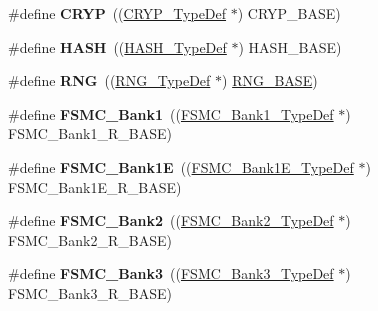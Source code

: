 \begin{DoxyCompactItemize}
\item 
\mbox{\label{group___peripheral__declaration_gaf8c417168aefe66429b5f1b6adc9effa}} 
\#define {\bfseries C\+R\+YP}~((\hyperlink{struct_c_r_y_p___type_def}{C\+R\+Y\+P\+\_\+\+Type\+Def} $\ast$) C\+R\+Y\+P\+\_\+\+B\+A\+SE)
\item 
\mbox{\label{group___peripheral__declaration_ga7172fe24d1ffc31d15b20a77ea9f34dd}} 
\#define {\bfseries H\+A\+SH}~((\hyperlink{struct_h_a_s_h___type_def}{H\+A\+S\+H\+\_\+\+Type\+Def} $\ast$) H\+A\+S\+H\+\_\+\+B\+A\+SE)
\item 
\mbox{\label{group___peripheral__declaration_ga5b0885b8b55bbc13691092b704d9309f}} 
\#define {\bfseries R\+NG}~((\hyperlink{struct_r_n_g___type_def}{R\+N\+G\+\_\+\+Type\+Def} $\ast$) \hyperlink{group___peripheral__memory__map_gab92662976cfe62457141e5b4f83d541c}{R\+N\+G\+\_\+\+B\+A\+SE})
\item 
\mbox{\label{group___peripheral__declaration_ga2a759bad07fe730c99f9e1490e646220}} 
\#define {\bfseries F\+S\+M\+C\+\_\+\+Bank1}~((\hyperlink{struct_f_s_m_c___bank1___type_def}{F\+S\+M\+C\+\_\+\+Bank1\+\_\+\+Type\+Def} $\ast$) F\+S\+M\+C\+\_\+\+Bank1\+\_\+\+R\+\_\+\+B\+A\+SE)
\item 
\mbox{\label{group___peripheral__declaration_ga422986101f42a8811ae89ac69deb2759}} 
\#define {\bfseries F\+S\+M\+C\+\_\+\+Bank1E}~((\hyperlink{struct_f_s_m_c___bank1_e___type_def}{F\+S\+M\+C\+\_\+\+Bank1\+E\+\_\+\+Type\+Def} $\ast$) F\+S\+M\+C\+\_\+\+Bank1\+E\+\_\+\+R\+\_\+\+B\+A\+SE)
\item 
\mbox{\label{group___peripheral__declaration_gabb3dfb5e88694aa2983ecabd33a55e0a}} 
\#define {\bfseries F\+S\+M\+C\+\_\+\+Bank2}~((\hyperlink{struct_f_s_m_c___bank2___type_def}{F\+S\+M\+C\+\_\+\+Bank2\+\_\+\+Type\+Def} $\ast$) F\+S\+M\+C\+\_\+\+Bank2\+\_\+\+R\+\_\+\+B\+A\+SE)
\item 
\mbox{\label{group___peripheral__declaration_ga411eedc00b5b2b22b494004d4f41b736}} 
\#define {\bfseries F\+S\+M\+C\+\_\+\+Bank3}~((\hyperlink{struct_f_s_m_c___bank3___type_def}{F\+S\+M\+C\+\_\+\+Bank3\+\_\+\+Type\+Def} $\ast$) F\+S\+M\+C\+\_\+\+Bank3\+\_\+\+R\+\_\+\+B\+A\+SE)

\end{DoxyCompactItemize}
